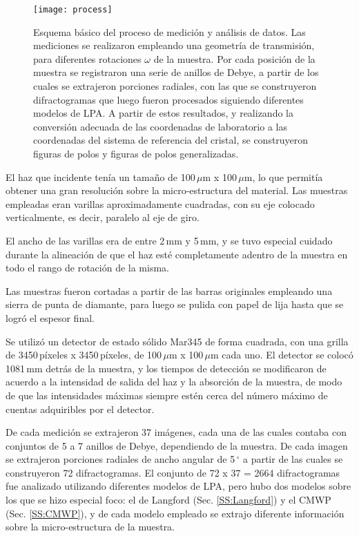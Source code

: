 \begin{figure}[!htb]
  \centering
  \texttt{[image: process]}
  \caption{Esquema básico del proceso de medición y análisis de datos. Las mediciones se realizaron empleando una geometría de transmisión, para diferentes rotaciones $\omega$ de la muestra. Por cada posición de la muestra se registraron una serie de anillos de Debye, a partir de los cuales se extrajeron porciones radiales, con las que se construyeron difractogramas que luego fueron procesados siguiendo diferentes modelos de LPA. A partir de estos resultados, y realizando la conversión adecuada de las coordenadas de laboratorio a las coordenadas del sistema de referencia del cristal, se construyeron figuras de polos y figuras de polos generalizadas.}
  \label{fig:transmision}
\end{figure}


El haz que incidente tenía un tamaño de 100\,$\mu$m x 100\,$\mu$m, lo que permitía obtener una gran resolución sobre la micro-estructura del material.
Las muestras empleadas eran varillas aproximadamente cuadradas, con su eje colocado verticalmente, es decir, paralelo al eje de giro.

El ancho de las varillas era de entre 2\,mm y 5\,mm, y se tuvo especial cuidado durante la alineación de que el haz esté completamente adentro de la muestra en todo el rango de rotación de la misma. 

Las muestras fueron cortadas a partir de las barras originales empleando una sierra de punta de diamante, para luego se pulida con papel de lija hasta que se logró el espesor final.

Se utilizó un detector de estado sólido Mar345 de forma cuadrada, con una grilla de 3450\,píxeles x 3450\,píxeles, de 100\,$\mu$m x 100\,$\mu$m cada uno.
El detector se colocó 1081\,mm detrás de la muestra, y los tiempos de detección se modificaron de acuerdo a la intensidad de salida del haz y la absorción de la muestra, de modo de que las intensidades máximas siempre estén cerca del número máximo de cuentas adquiribles por el detector.

De cada medición se extrajeron 37 imágenes, cada una de las cuales contaba con conjuntos de 5 a 7 anillos de Debye, dependiendo de la muestra.
De cada imagen se extrajeron porciones radiales de ancho angular de 5\,$^{\circ}$ a partir de las cuales se construyeron 72 difractogramas.
El conjunto de 72 x 37 = 2664 difractogramas fue analizado utilizando diferentes modelos de LPA, pero hubo dos modelos sobre los que se hizo especial foco: el de Langford (Sec. \ref{SS:Langford}) y el CMWP (Sec. \ref{SS:CMWP}), y de cada modelo empleado se extrajo diferente información sobre la micro-estructura de la muestra.

